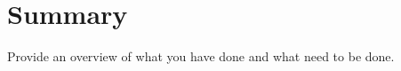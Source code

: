 \documentclass[12pt]{report}
\begin{document}
\section{Summary}
\label{ch:conclusion}


Provide an overview of what you have done and what need to be done.






\pagebreak

\begin{footnotesize}

%

\end{footnotesize}
\end{document}
